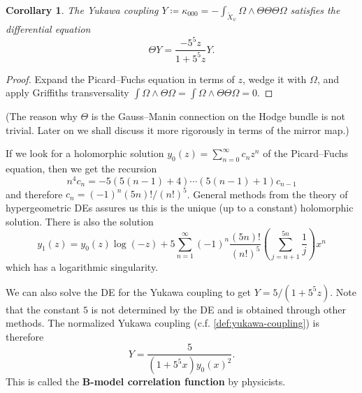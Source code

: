 \documentclass{report}
\theoremstyle{plain}
\newtheorem{corollary}[theorem]{Corollary}
\theoremstyle{definition}
\theoremstyle{remark}
\begin{document}
\begin{corollary}
  The Yukawa coupling $Y \coloneqq \kappa_{000} =
  -\int_{\tilde{X}_\psi} \Omega \wedge \Theta \Theta \Theta \Omega$
  satisfies the differential equation
  \[ \Theta Y = \frac{-5^5 z}{1 + 5^5z} Y. \]
\end{corollary}

\begin{proof}
  Expand the Picard--Fuchs equation in terms of $z$, wedge it with
  $\Omega$, and apply Griffiths transversality $\int \Omega \wedge
  \Theta \Omega = \int \Omega \wedge \Theta\Theta\Omega = 0$.
\end{proof}

(The reason why $\Theta$ is the Gauss--Manin connection on the Hodge
bundle is not trivial. Later on we shall discuss it more rigorously in
terms of the mirror map.)

If we look for a holomorphic solution $y_0(z) = \sum_{n=0}^\infty c_n
z^n$ of the Picard--Fuchs equation, then we get the recursion
\[ n^4 c_n = -5(5(n-1)+4) \cdots (5(n-1)+1) c_{n-1} \]
and therefore $c_n = (-1)^n(5n)!/(n!)^5$. General methods from the
theory of hypergeometric DEs assures us this is the unique (up to a
constant) holomorphic solution. There is also the solution
\[ y_1(z) = y_0(z) \log(-z) + 5 \sum_{n=1}^\infty (-1)^n\frac{(5n)!}{(n!)^5} \left(\sum_{j=n+1}^{5n} \frac{1}{j}\right) x^n \]
which has a logarithmic singularity.

We can also solve the DE for the Yukawa coupling to get $Y = 5/(1 +
5^5z)$. Note that the constant $5$ is not determined by the DE and is
obtained through other methods. The normalized Yukawa coupling (c.f.
\ref{def:yukawa-coupling}) is therefore
\[ Y = \frac{5}{(1 + 5^5x) y_0(x)^2}. \]
This is called the {\bf B-model correlation function} by physicists.
\end{document}
